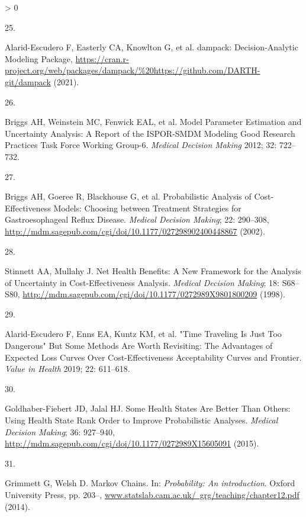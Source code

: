 \documentclass[
]{article}
\newlength{\cslhangindent}
\newlength{\csllabelwidth}
\newenvironment{CSLReferences}[2] %
 {%
  \setlength{\parindent}{0pt}
  \ifodd #1 \everypar{\setlength{\hangindent}{\cslhangindent}}\ignorespaces\fi
  \ifnum #2 > 0
  \setlength{\parskip}{#2\baselineskip}
  \fi
 }%
 {}
\newcommand{\CSLLeftMargin}[1]{\parbox[t]{\csllabelwidth}{#1}}
\newcommand{\CSLRightInline}[1]{\parbox[t]{\linewidth - \csllabelwidth}{#1}\break}
\begin{document}
\begin{CSLReferences}{0}{0}
\leavevmode\hypertarget{ref-Alarid-Escudero2021}{}%
\CSLLeftMargin{25. }
\CSLRightInline{Alarid-Escudero F, Easterly CA, Knowlton G, et al. {dampack: Decision-Analytic Modeling Package}, \url{https://cran.r-project.org/web/packages/dampack/\%20https://github.com/DARTH-git/dampack} (2021).}

\leavevmode\hypertarget{ref-Briggs2012}{}%
\CSLLeftMargin{26. }
\CSLRightInline{Briggs AH, Weinstein MC, Fenwick EAL, et al. {Model Parameter Estimation and Uncertainty Analysis: A Report of the ISPOR-SMDM Modeling Good Research Practices Task Force Working Group-6.} \emph{Medical Decision Making} 2012; 32: 722--732.}

\leavevmode\hypertarget{ref-Briggs2002}{}%
\CSLLeftMargin{27. }
\CSLRightInline{Briggs AH, Goeree R, Blackhouse G, et al. {Probabilistic Analysis of Cost-Effectiveness Models: Choosing between Treatment Strategies for Gastroesophageal Reflux Disease}. \emph{Medical Decision Making}; 22: 290--308, \url{http://mdm.sagepub.com/cgi/doi/10.1177/027298902400448867} (2002).}

\leavevmode\hypertarget{ref-Stinnett1998b}{}%
\CSLLeftMargin{28. }
\CSLRightInline{Stinnett AA, Mullahy J. {Net Health Benefits: A New Framework for the Analysis of Uncertainty in Cost-Effectiveness Analysis}. \emph{Medical Decision Making}; 18: S68--S80, \url{http://mdm.sagepub.com/cgi/doi/10.1177/0272989X9801800209} (1998).}

\leavevmode\hypertarget{ref-Alarid-Escudero2019}{}%
\CSLLeftMargin{29. }
\CSLRightInline{Alarid-Escudero F, Enns EA, Kuntz KM, et al. {"Time Traveling Is Just Too Dangerous" But Some Methods Are Worth Revisiting: The Advantages of Expected Loss Curves Over Cost-Effectiveness Acceptability Curves and Frontier}. \emph{Value in Health} 2019; 22: 611--618.}

\leavevmode\hypertarget{ref-Goldhaber-Fiebert2015}{}%
\CSLLeftMargin{30. }
\CSLRightInline{Goldhaber-Fiebert JD, Jalal HJ. {Some Health States Are Better Than Others: Using Health State Rank Order to Improve Probabilistic Analyses}. \emph{Medical Decision Making}; 36: 927--940, \url{http://mdm.sagepub.com/cgi/doi/10.1177/0272989X15605091} (2015).}

\leavevmode\hypertarget{ref-Grimmett2014}{}%
\CSLLeftMargin{31. }
\CSLRightInline{Grimmett G, Welsh D. {Markov Chains}. In: \emph{Probability: An introduction}. Oxford University Press, pp. 203--, \href{https://www.statslab.cam.ac.uk/\%C2\%A0grg/teaching/chapter12.pdf}{www.statslab.cam.ac.uk/~grg/teaching/chapter12.pdf} (2014).}


\end{CSLReferences}
\end{document}
